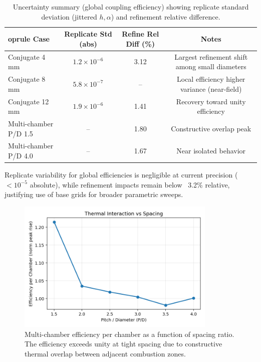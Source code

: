 \begin{table}[H]
\centering
\caption{Uncertainty summary (global coupling efficiency) showing replicate standard deviation (jittered $h,\alpha$) and refinement relative difference.}
\label{tab:uncertainty_summary}
\begin{tabular}{@{}lccc@{}}
	oprule
Case & Replicate Std (abs) & Refine Rel Diff (\%) & Notes \\
\midrule
Conjugate 4 mm & $1.2\times10^{-6}$ & 3.12 & Largest refinement shift among small diameters \\
Conjugate 8 mm & $5.8\times10^{-7}$ & -- & Local efficiency higher variance (near-field) \\
Conjugate 12 mm & $1.9\times10^{-6}$ & 1.41 & Recovery toward unity efficiency \\
Multi-chamber P/D 1.5 & -- & 1.80 & Constructive overlap peak \\
Multi-chamber P/D 4.0 & -- & 1.67 & Near isolated behavior \\
\bottomrule
\end{tabular}
\end{table}

Replicate variability for global efficiencies is negligible at current precision (\(<10^{-5}\) absolute), while refinement impacts remain below ~3.2\% relative, justifying use of base grids for broader parametric sweeps.

\begin{figure}[H]
    \centering
    \includegraphics[width=0.85\textwidth]{figures/simulations/multi_chamber_efficiency.png}
    \caption{Multi-chamber efficiency per chamber as a function of spacing ratio. The efficiency exceeds unity at tight spacing due to constructive thermal overlap between adjacent combustion zones.}
    \label{fig:multi_efficiency}
\end{figure}

